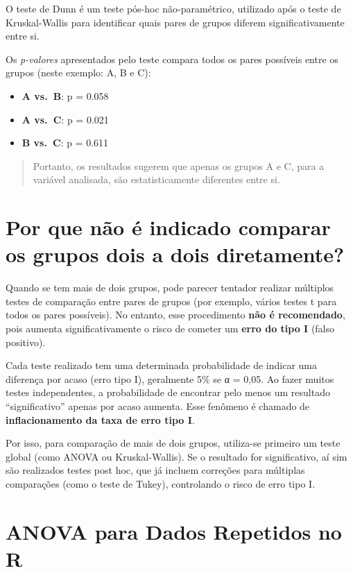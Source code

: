 \documentclass[
]{book}
\providecommand{\tightlist}{%
  \setlength{\itemsep}{0pt}\setlength{\parskip}{0pt}}
\begin{document}
O teste de Dunn é um teste pós-hoc não-paramétrico, utilizado após o teste de Kruskal-Wallis para identificar quais pares de grupos diferem significativamente entre si.

Os \emph{p-valores} apresentados pelo teste compara todos os pares possíveis entre os grupos (neste exemplo: A, B e C):

\begin{itemize}
\tightlist
\item
  \textbf{A vs.~B}: p = 0.058
\item
  \textbf{A vs.~C}: p = 0.021
\item
  \textbf{B vs.~C}: p = 0.611
\end{itemize}

\begin{quote}
Portanto, os resultados sugerem que apenas os grupos A e C, para a variável analisada, são estatisticamente diferentes entre si.
\end{quote}

\section{Por que não é indicado comparar os grupos dois a dois diretamente?}\label{por-que-nuxe3o-uxe9-indicado-comparar-os-grupos-dois-a-dois-diretamente}

Quando se tem mais de dois grupos, pode parecer tentador realizar múltiplos testes de comparação entre pares de grupos (por exemplo, vários testes t para todos os pares possíveis). No entanto, esse procedimento \textbf{não é recomendado}, pois aumenta significativamente o risco de cometer um \textbf{erro do tipo I} (falso positivo).

Cada teste realizado tem uma determinada probabilidade de indicar uma diferença por acaso (erro tipo I), geralmente 5\% se α = 0,05. Ao fazer muitos testes independentes, a probabilidade de encontrar pelo menos um resultado ``significativo'' apenas por acaso aumenta. Esse fenômeno é chamado de \textbf{inflacionamento da taxa de erro tipo I}.

Por isso, para comparação de mais de dois grupos, utiliza-se primeiro um teste global (como ANOVA ou Kruskal-Wallis). Se o resultado for significativo, aí sim são realizados testes post hoc, que já incluem correções para múltiplas comparações (como o teste de Tukey), controlando o risco de erro tipo I.

\section{ANOVA para Dados Repetidos no R}\label{anova-para-dados-repetidos-no-r}
\end{document}
